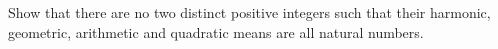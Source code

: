 Show that there are no two distinct positive integers such that their harmonic,
geometric, arithmetic and quadratic means are all natural numbers.